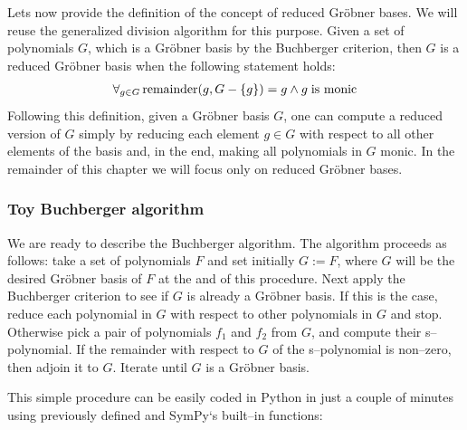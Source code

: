 Lets now provide the definition of the concept of reduced Gröbner bases. We will reuse the generalized
division algorithm for this purpose. Given a set of polynomials $G$, which is a Gröbner basis by the
Buchberger criterion, then $G$ is a reduced Gröbner basis when the following statement holds:
\begin{gather}
\begin{split}\forall_{g \in G} \operatorname{remainder}(g, G - \{g\}) = g \wedge g\;\mbox{is monic}\end{split}\notag
\end{gather}
Following this definition, given a Gröbner basis $G$, one can compute a reduced version of $G$
simply by reducing each element $g \in G$ with respect to all other elements of the basis and, in
the end, making all polynomials in $G$ monic. In the remainder of this chapter we will focus only
on reduced Gröbner bases.
\hypertarget{gb-toy}{}

\subsubsection{Toy Buchberger algorithm}

We are ready to describe the Buchberger algorithm. The algorithm proceeds as follows: take a
set of polynomials $F$ and set initially $G := F$, where $G$ will be the desired Gröbner
basis of $F$ at the and of this procedure. Next apply the Buchberger criterion to see if
$G$ is already a Gröbner basis. If this is the case, reduce each polynomial in $G$ with
respect to other polynomials in $G$ and stop. Otherwise pick a pair of polynomials $f_1$ and
$f_2$ from $G$, and compute their s--polynomial. If the remainder with respect to $G$ of the
s--polynomial is non--zero, then adjoin it to $G$. Iterate until $G$ is a Gröbner basis.

This simple procedure can be easily coded in Python in just a couple of minutes using previously
defined  and SymPy`s built--in  functions:

